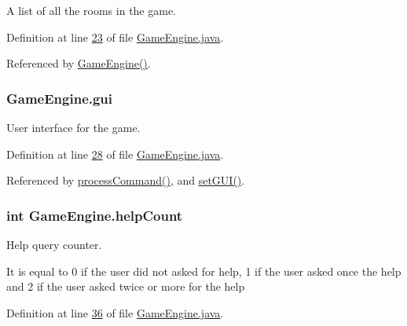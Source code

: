 A list of all the rooms in the game. 



Definition at line \hyperlink{GameEngine_8java_source_l00023}{23} of file \hyperlink{GameEngine_8java_source}{Game\-Engine.\-java}.



Referenced by \hyperlink{GameEngine_8java_source_l00047}{Game\-Engine()}.

\hypertarget{classGameEngine_a2a7d0bb6183b3f3ef3ee2008926374a0}{
\subsubsection[{gui}]{ Game\-Engine.\-gui\hspace{0.3cm}{\ttfamily [private]}}}\label{classGameEngine_a2a7d0bb6183b3f3ef3ee2008926374a0}


User interface for the game. 



Definition at line \hyperlink{GameEngine_8java_source_l00028}{28} of file \hyperlink{GameEngine_8java_source}{Game\-Engine.\-java}.



Referenced by \hyperlink{GameEngine_8java_source_l00167}{process\-Command()}, and \hyperlink{GameEngine_8java_source_l00059}{set\-G\-U\-I()}.

\hypertarget{classGameEngine_a308a9926d553d53cb4c56c28588f6c62}{
\subsubsection[{help\-Count}]{\setlength{\rightskip}{0pt plus 5cm}int Game\-Engine.\-help\-Count\hspace{0.3cm}{\ttfamily [private]}}}\label{classGameEngine_a308a9926d553d53cb4c56c28588f6c62}


Help query counter. 

It is equal to 0 if the user did not asked for help, 1 if the user asked once the help and 2 if the user asked twice or more for the help 

Definition at line \hyperlink{GameEngine_8java_source_l00036}{36} of file \hyperlink{GameEngine_8java_source}{Game\-Engine.\-java}.



